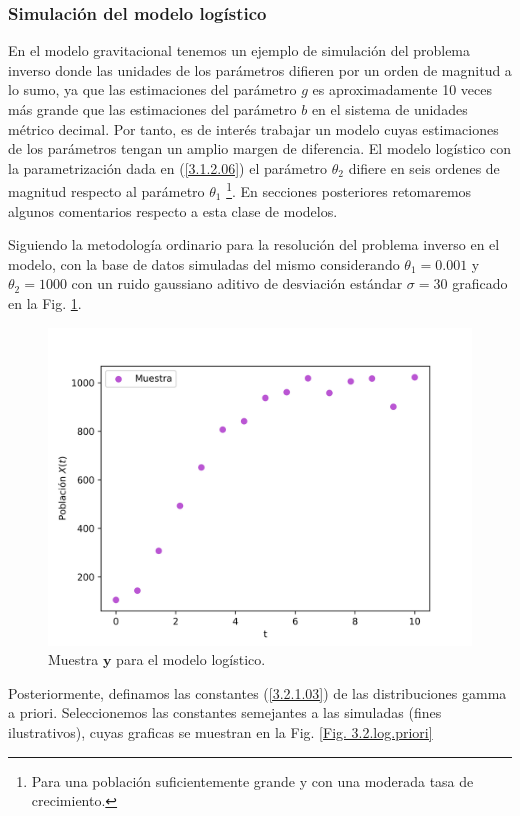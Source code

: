 \subsubsection{Simulación del modelo logístico}

En el modelo gravitacional tenemos un ejemplo de simulación del problema inverso donde las unidades de los parámetros difieren por un orden de magnitud a lo sumo, ya que las estimaciones del parámetro $g$ es aproximadamente 10 veces más grande que las estimaciones del parámetro $b$ en el sistema de unidades métrico decimal. Por tanto, es de interés trabajar un modelo cuyas estimaciones de los parámetros tengan un amplio margen de diferencia. El modelo logístico con la parametrización dada en (\ref{3.1.2.06}) el parámetro $\theta_2$ difiere en seis ordenes de magnitud respecto al parámetro $\theta_1$ \footnote{Para una población suficientemente grande y con una moderada tasa de crecimiento.}. En secciones posteriores retomaremos algunos comentarios respecto a esta clase de modelos.

Siguiendo la metodología ordinario para la resolución del problema inverso en el modelo, con la base de datos simuladas del mismo considerando $\theta_1 = 0.001$ y $\theta_2 = 1000$ con un ruido gaussiano aditivo de desviación estándar $\sigma = 30$ graficado en la Fig. \ref{Fig. 3.2.log.muestra}.

\begin{figure}[H] 
    \centering 
    \includegraphics[width = 10 cm ]{img/Exp_Central_logistico_sigma/Figuras/Generales/Muestra_logistico_sigma.png} 
    \caption{Muestra $\mathbf{y}$ para el modelo logístico.}
    \label{Fig. 3.2.log.muestra}
\end{figure} 

Posteriormente, definamos las constantes (\ref{3.2.1.03}) de las distribuciones gamma a priori. Seleccionemos las constantes semejantes a las simuladas (fines ilustrativos), cuyas graficas se muestran en la Fig. \ref{Fig. 3.2.log.priori}

